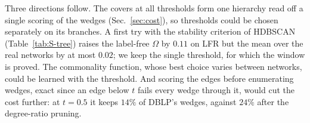 Three directions follow. The covers at all thresholds form one hierarchy read off a
single scoring of the wedges (Sec.~\ref{sec:cost}), so thresholds could be chosen
separately on its branches. A first try with the stability criterion of HDBSCAN~\cite{campello2013density} (Table~\ref{tab:S-tree}) raises the label-free $\Omega$ by $0.11$ on LFR but the mean over the real networks by at most $0.02$; we keep the single threshold, for which the window is proved. The commonality function, whose best choice varies between networks, could be learned with the threshold. And scoring the edges before enumerating wedges, exact since an edge below $t$ fails every wedge through it, would cut the cost further: at $t=0.5$ it keeps $14\%$ of DBLP's wedges, against $24\%$ after the degree-ratio pruning.
